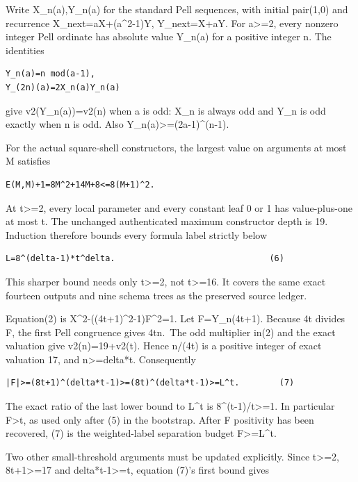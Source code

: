 Write X\_n(a),Y\_n(a) for the standard Pell sequences, with initial
pair(1,0) and recurrence X\_next=aX+(a\^{}2-1)Y, Y\_next=X+aY. For
a\textgreater=2, every nonzero integer Pell ordinate has absolute value
Y\_n(a) for a positive integer n. The identities

\begin{verbatim}
Y_n(a)=n mod(a-1),
Y_(2n)(a)=2X_n(a)Y_n(a)
\end{verbatim}

give v2(Y\_n(a))=v2(n) when a is odd: X\_n is always odd and Y\_n is odd
exactly when n is odd. Also Y\_n(a)\textgreater=(2a-1)\^{}(n-1).

For the actual square-shell constructors, the largest value on arguments
at most M satisfies

\begin{verbatim}
E(M,M)+1=8M^2+14M+8<=8(M+1)^2.
\end{verbatim}

At t\textgreater=2, every local parameter and every constant leaf 0 or 1
has value-plus-one at most t. The unchanged authenticated maximum
constructor depth is 19. Induction therefore bounds every formula label
strictly below

\begin{verbatim}
L=8^(delta-1)*t^delta.                               (6)
\end{verbatim}

This sharper bound needs only t\textgreater=2, not t\textgreater=16. It
covers the same exact fourteen outputs and nine schema trees as the
preserved source ledger.

Equation(2) is X\^{}2-((4t+1)\^{}2-1)F\^{}2=1. Let
\textbar F\textbar=Y\_n(4t+1). Because 4t divides F, the first Pell
congruence gives 4t\textbar n.~The odd multiplier in(2) and the exact
valuation give v2(n)=19+v2(t). Hence n/(4t) is a positive integer of
exact valuation 17, and n\textgreater=delta*t. Consequently

\begin{verbatim}
|F|>=(8t+1)^(delta*t-1)>=(8t)^(delta*t-1)>=L^t.        (7)
\end{verbatim}

The exact ratio of the last lower bound to L\^{}t is
8\^{}(t-1)/t\textgreater=1. In particular
\textbar F\textbar\textgreater t, as used only after (5) in the
bootstrap. After F positivity has been recovered, (7) is the
weighted-label separation budget F\textgreater=L\^{}t.

Two other small-threshold arguments must be updated explicitly. Since
t\textgreater=2, 8t+1\textgreater=17 and delta*t-1\textgreater=t,
equation (7)'s first bound gives

